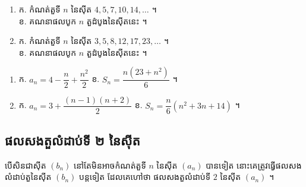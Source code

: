 \begin{pro}
\begin{enumerate}[1]
  \item ក. កំណត់តួទី $n$ នៃស៊ីត $4, 5, 7, 10, 14, \ldots$ ។\\
  ខ. គណនាផលបូក $n$ តួដំបូងនៃស៊ីតនេះ ។
  \item ក. កំណត់តួទី $n$ នៃស៊ីត $3, 5, 8, 12, 17, 23, \ldots$ ។\\
  ខ. គណនាផលបូក $n$ តួដំបូងនៃស៊ីតនេះ ។
\end{enumerate}
\ans
\begin{enumerate}[1]
  \item ក. $a_n = 4 - \dfrac{n}{2} + \dfrac{n^2}{2}$ \quad ខ. $S_n = \dfrac{n(23 + n^2)}{6}$ ។
  \item ក. $a_n = 3 + \dfrac{(n - 1)(n + 2)}{2}$ \quad ខ. $S_n = \dfrac{n}{6}(n^2 + 3n + 14)$ ។
\end{enumerate}
\end{pro}

\subsection{ផលសងតួលំដាប់ទី ២ នៃស៊ីត}

បើសិនជាស៊ីត $(b_n)$ នៅតែមិនអាចកំណត់តួទី $n$ នៃស៊ីត $(a_n)$ បានទៀត នោះគេត្រូវធ្វើផលសងលំដាប់តួនៃស៊ីត $(b_n)$ បន្តទៀត ដែលគេហៅថា ផលសងតួលំដាប់ទី $2$ នៃស៊ីត $(a_n)$ ។

